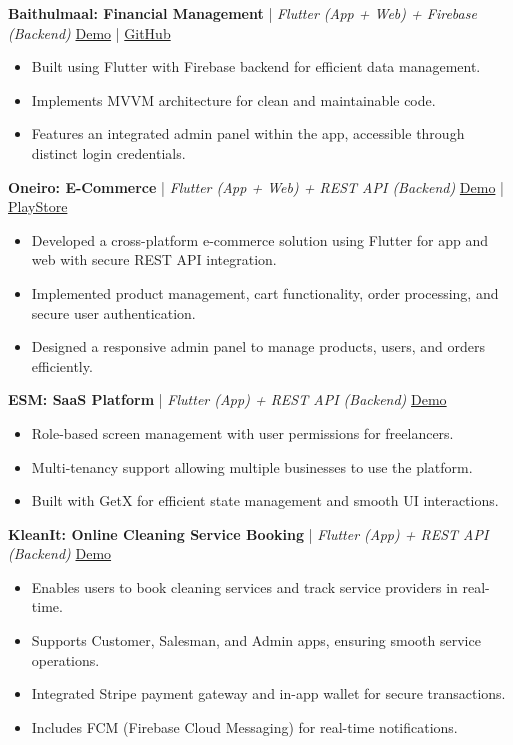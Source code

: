 \documentclass[a4paper,11pt]{article}
\begin{document}
\textbf{Baithulmaal: Financial Management} | \textit{Flutter (App + Web) + Firebase (Backend)} \hfill \href{}{Demo} | \href{}{GitHub}
\begin{itemize}[leftmargin=1.5em, itemsep=2pt, topsep=4pt]
    \item Built using Flutter with Firebase backend for efficient data management.
    \item Implements MVVM architecture for clean and maintainable code.
    \item Features an integrated admin panel within the app, accessible through distinct login credentials.
\end{itemize}

\textbf{Oneiro: E-Commerce} | \textit{Flutter (App + Web) + REST API (Backend)} \hfill \href{}{Demo} | \href{}{PlayStore}
\begin{itemize}[leftmargin=1.5em, itemsep=2pt, topsep=4pt]
    \item Developed a cross-platform e-commerce solution using Flutter for app and web with secure REST API integration.
    \item Implemented product management, cart functionality, order processing, and secure user authentication.
    \item Designed a responsive admin panel to manage products, users, and orders efficiently.
\end{itemize}

\textbf{ESM: SaaS Platform} | \textit{Flutter (App) + REST API (Backend)} \hfill \href{}{Demo}
\begin{itemize}[leftmargin=1.5em, itemsep=2pt, topsep=4pt]
    \item Role-based screen management with user permissions for freelancers.
    \item Multi-tenancy support allowing multiple businesses to use the platform.
    \item Built with GetX for efficient state management and smooth UI interactions.
\end{itemize}

\textbf{KleanIt: Online Cleaning Service Booking} | \textit{Flutter (App) + REST API (Backend)} \hfill \href{}{Demo}
\begin{itemize}[leftmargin=1.5em, itemsep=2pt, topsep=4pt]
    \item Enables users to book cleaning services and track service providers in real-time.
    \item Supports Customer, Salesman, and Admin apps, ensuring smooth service operations.
    \item Integrated Stripe payment gateway and in-app wallet for secure transactions.
    \item Includes FCM (Firebase Cloud Messaging) for real-time notifications.
\end{itemize}
\end{document}

